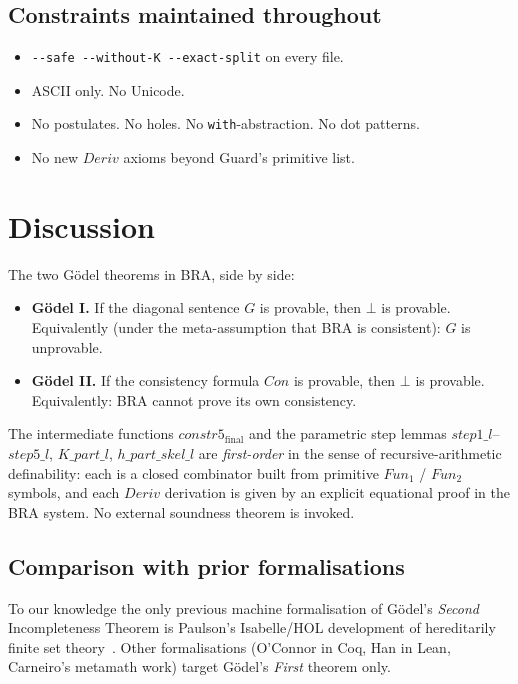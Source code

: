 \documentclass[11pt]{article}
\begin{document}
\subsection{Constraints maintained throughout}

\begin{itemize}
  \item \verb|--safe --without-K --exact-split| on every file.
  \item ASCII only.  No Unicode.
  \item No postulates.  No holes.  No \verb|with|-abstraction.  No dot patterns.
  \item No new $\mathit{Deriv}$ axioms beyond Guard's primitive list.
\end{itemize}

\section{Discussion}

The two G\"odel theorems in BRA, side by side:
\begin{itemize}
  \item \textbf{G\"odel I.} If the diagonal sentence $G$ is provable, then $\bot$ is provable.
  Equivalently (under the meta-assumption that BRA is consistent): $G$ is unprovable.
  \item \textbf{G\"odel II.} If the consistency formula $\mathit{Con}$ is provable, then $\bot$ is provable.
  Equivalently: BRA cannot prove its own consistency.
\end{itemize}

The intermediate functions $\mathit{constr5}_{\mathrm{final}}$ and the
parametric step lemmas $\mathit{step1\_l}$--$\mathit{step5\_l}$,
$K\_\mathit{part}\_l$, $h\_\mathit{part}\_\mathit{skel}\_l$ are
\emph{first-order} in the sense of recursive-arithmetic definability:
each is a closed combinator built from primitive $\mathit{Fun}_1$ /
$\mathit{Fun}_2$ symbols, and each $\mathit{Deriv}$ derivation is given
by an explicit equational proof in the BRA system.  No external
soundness theorem is invoked.

\subsection{Comparison with prior formalisations}

To our knowledge the only previous machine formalisation of G\"odel's
\emph{Second} Incompleteness Theorem is Paulson's Isabelle/HOL
development of hereditarily finite set theory~\cite{paulson2014}.
Other formalisations (O'Connor in Coq, Han in Lean, Carneiro's metamath
work) target G\"odel's \emph{First} theorem only.
\end{document}
